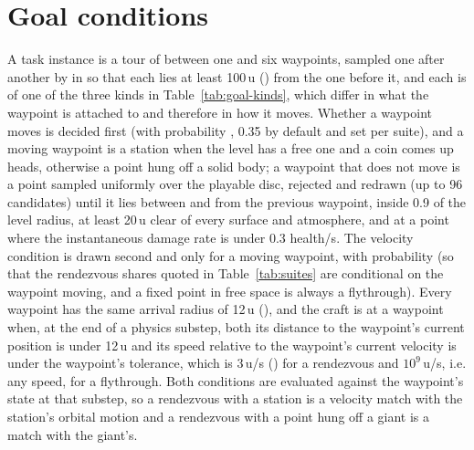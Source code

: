 
\section{Goal conditions}
\label{app:goals}

A task instance is a tour of between one and six waypoints, sampled one after
another by  in  so that each lies at
least 100\,u () from the one before it, and each is of one of
the three kinds in Table~\ref{tab:goal-kinds}, which differ in what the
waypoint is attached to and therefore in how it moves. Whether a waypoint
moves is decided first (with probability , 0.35 by default
and set per suite), and a moving waypoint is a station when the level has a
free one and a coin comes up heads, otherwise a point hung off a solid body; a
waypoint that does not move is a point sampled uniformly over the playable
disc, rejected and redrawn (up to 96 candidates) until it lies between
 and  from the previous waypoint, inside 0.9 of
the level radius, at least 20\,u clear of every surface and atmosphere, and at
a point where the instantaneous damage rate is under 0.3 health/s. The
velocity condition is drawn second and only for a moving waypoint, with
probability  (so that the rendezvous shares quoted in
Table~\ref{tab:suites} are conditional on the waypoint moving, and a fixed
point in free space is always a flythrough). Every waypoint has the same
arrival radius of 12\,u (), and the craft is at a waypoint
when, at the end of a physics substep, both its distance to the waypoint's
current position is under 12\,u and its speed relative to the waypoint's
current velocity is under the waypoint's tolerance, which is 3\,u/s
() for a rendezvous and $10^9$\,u/s, i.e. any speed,
for a flythrough. Both conditions are evaluated against the waypoint's state
at that substep, so a rendezvous with a station is a velocity match with the
station's orbital motion and a rendezvous with a point hung off a giant is a
match with the giant's.

